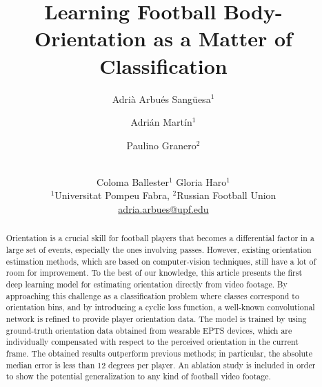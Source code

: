 \documentclass{article}
\title{Learning Football Body-Orientation as a Matter of Classification}
\author{
Adrià Arbués Sangüesa$^1$\and
Adrián Martín$^1$\and
Paulino Granero$^{2}$\and \\
Coloma Ballester$^1$\And
Gloria Haro$^1$
\\
\affiliations
$^1$Universitat Pompeu Fabra, $^2$Russian Football Union\\
\emails
\href{mailto:adria.arbues@upf.edu}{adria.arbues@upf.edu} 
}
\begin{document}
\maketitle

\begin{abstract}
Orientation is a crucial skill for football players that becomes a differential factor in a large set of events, especially the ones involving passes. However, existing orientation estimation methods, which are based on computer-vision techniques, still have a lot of room for improvement. To the best of our knowledge, this article presents the first deep learning model for estimating orientation directly from video footage. By approaching this challenge as a classification problem where classes correspond to orientation bins, and by introducing a cyclic loss function, a well-known convolutional network is refined to provide player orientation data. The model is trained by using ground-truth orientation data obtained from wearable EPTS devices, which are individually compensated with respect to the perceived orientation in the current frame. The obtained results outperform previous methods; in particular, the absolute median error is less than 12 degrees per player. An ablation study is included in order to show the potential generalization to any kind of football video footage. 
\end{abstract}
\end{document}
